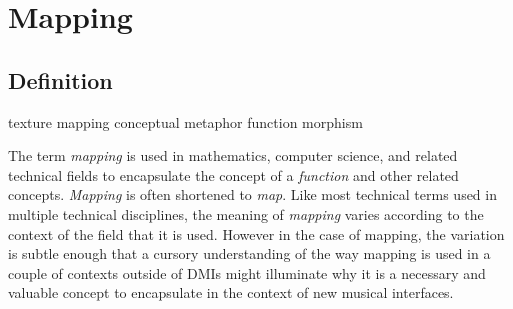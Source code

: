 \resetdatestamp

\newcommand\Dfrac[2]{\frac{\displaystyle #1}{\displaystyle #2}}
\newcommand{\mathBF}[1]{\mbox{\boldmath $#1$}}
\newcommand{\C}[1]{\mathBF{#1}}

\chapter{Mapping}

\begin{comment}
\TeX{} does a marvelous job of setting mathematical formulas, most often
 choosing pleasing spacing.
However, on occasion one should intercede to improve the layout.
This chapter defines a few such occasions.
In addition, this chapter documents some features of the {\tt amsmath}
 package which overcome difficulties in typesetting some mathematical
 forms.
The {\tt amsmath} package is documented 
 in {\it The \LaTeX{} Companion} \cite{Goossens:1997}.

The modified setup is typeset as
\begin{equation}
  G(z) = \begin{cases}
           \Dfrac {P(z)}{1+z^{-1}} & \text{for $p$ even}, \\[1ex]
           P(z)                    & \text{for $p$ odd}.
         \end{cases}
\end{equation}

With the modified definitions, we get the following.
\def\hC#1{\C{\hat{#1}}\vphantom{\C{#1}}}           %
\def\htC#1{\C{\hat{\tilde{#1}}}\vphantom{\C{#1}}}  %
\def\tC#1{\C{\tilde{#1}}\vphantom{\C{#1}}}         %
\begin{equation}
\begin{split}
  \C{d}^{(i)} &= \hC{v}^{(i)} - \htC{v}^{(i)} \\
  \C{n}^{(i)} &= \C{u}^{(i)} - \tC{v}^{(i)}
\end{split}
\end{equation}
\end{comment}

\section{Definition}

texture mapping
conceptual metaphor
function
morphism

The term \emph{mapping} is used in mathematics, computer science, and related technical fields to encapsulate the concept of a \emph{function} and other related concepts. \emph{Mapping} is often shortened to \emph{map}. Like most technical terms used in multiple technical disciplines, the meaning of \emph{mapping} varies according to the context of the field that it is used. However in the case of mapping, the variation is subtle enough that a cursory understanding of the way mapping is used in a couple of contexts outside of DMIs might illuminate why it is a necessary and valuable concept to encapsulate in the context of new musical interfaces.

